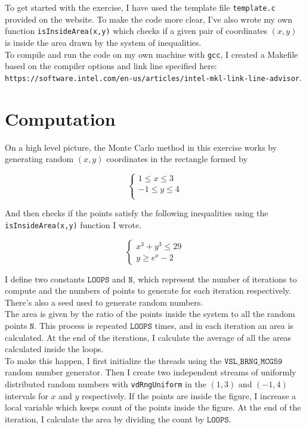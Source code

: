 \documentclass{article}
\newcommand{\code}{\texttt}
\begin{document}
To get started with the exercise, I have used the template file \code{template.c} provided on the website. To make the code more clear, I've also wrote my own function \code{isInsideArea(x,y)} which checks if a given pair of coordinates $(x, y)$ is inside the area drawn by the system of inequalities.\\

To compile and run the code on my own machine with \code{gcc}, I created a Makefile based on the compiler options and link line specified here:\\ \code{https://software.intel.com/en-us/articles/intel-mkl-link-line-advisor}.

\section{Computation}
On a high level picture, the Monte Carlo method in this exercise works by generating random $(x,y)$ coordinates in the rectangle formed by

$$
\begin{cases}
1 \le x \le 3 \\
-1\le y \le 4 \\  
\end{cases}$$

And then checks if the points satisfy the following inequalities using the \code{isInsideArea(x,y)} function I wrote.

$$
\begin{cases}
x^3+y^3\le 29 \\
y \ge e^x -2
\end{cases}$$

I define two constants $\code{LOOPS}$ and $\code{N}$, which represent the number of iterations to compute and the numbers of points to generate for each iteration respectively. There's also a seed used to generate random numbers.\\

The area is given by the ratio of the points inside the system to all the random points $\code{N}$. This process is repeated $\code{LOOPS}$ times, and in each iteration an area is calculated. At the end of the iterations, I calculate the average of all the areas calculated inside the loops.\\

To make this happen, I first initialize the threads using the $\code{VSL\_BRNG\_MCG59}$ random number generator. Then I create two independent streams of uniformly distributed random numbers with \code{vdRngUniform} in the $(1,3)$ and $(-1,4)$ intervals for $x$ and $y$ respectively. If the points are inside the figure, I increase a local variable which keeps count of the points inside the figure. At the end of the iteration, I calculate the area by dividing the count by $\code{LOOPS}$.\\
\end{document}
